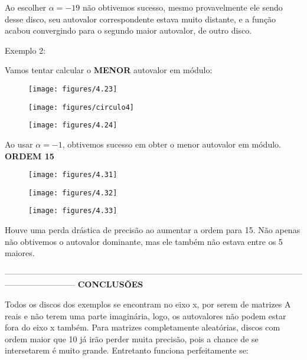 \documentclass[leqno]{article}
\numberwithin{equation}{section}
\begin{document}
\begin{enumerate}
		Ao escolher $\alpha = -19$ não obtivemos sucesso, mesmo provavelmente ele sendo desse disco, seu autovalor correspondente estava muito distante, e a função acabou convergindo para o segundo maior autovalor, de outro disco.
	
		Exemplo 2:
		
		Vamos tentar calcular o \textbf{MENOR} autovalor em módulo:
		
		\begin{figure}[H]
			\centering
			\texttt{[image: figures/4.23]}
			
		\end{figure}
		\begin{figure}[H]
			\centering
			\texttt{[image: figures/circulo4]}
		\end{figure}
		
		\begin{figure}[H]
			\centering
			\texttt{[image: figures/4.24]}
		\end{figure}
	
		Ao usar $\alpha = -1$, obtivemos sucesso em obter o menor autovalor em módulo.
	\newpage
		\textbf{{\large ORDEM 15}}
		
		\begin{figure}[H]
			\centering
			\texttt{[image: figures/4.31]}
			
		\end{figure}
		\begin{figure}[H]
			\centering
			\texttt{[image: figures/4.32]}
		\end{figure}
		
		\begin{figure}[H]
			\centering
			\texttt{[image: figures/4.33]}
		\end{figure}
	
		Houve uma perda drástica de precisão ao aumentar a ordem para 15. Não apenas não obtivemos o autovalor dominante, mas ele também não estava entre os 5 maiores.
		
		--------------------------------------------------------------------------------------------------------------------------------------
		\textbf{{\large CONCLUSÕES}}
		
		Todos os discos dos exemplos se encontram no eixo x, por serem de matrizes A reais e não terem uma parte imaginária, logo, os autovalores não podem estar fora do eixo x também. Para matrizes completamente aleatórias, discos com ordem maior que 10 já irão perder muita precisão, pois a chance de se intersetarem é muito grande. Entretanto funciona perfeitamente se:
		

\end{enumerate}
\end{document}

